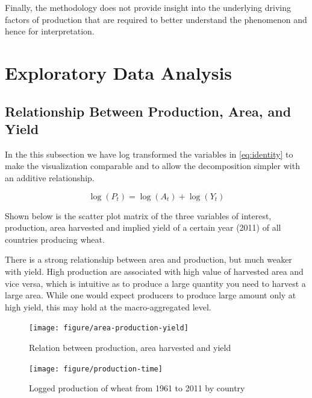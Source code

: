 \documentclass[nojss]{jss}\usepackage[]{graphicx}\usepackage[]{color}
\newenvironment{knitrout}{}{} %
\begin{document}
Finally, the methodology does not provide insight into the underlying
driving factors of production that are required to better understand
the phenomenon and hence for interpretation.


\section{Exploratory Data Analysis}




\subsection{Relationship Between Production, Area, and Yield}

In the this subsection we have log transformed the variables in
\ref{eq:identity} to make the visualization comparable and to allow
the decomposition simpler with an additive relationship.

\begin{equation}
  \label{eq:logIdentity}
  \log(P_t) = \log(A_t) + \log(Y_t)
\end{equation}

Shown below is the scatter plot matrix of the three variables of
interest, production, area harvested and implied yield of a certain
year (2011) of all countries producing wheat. 

There is a strong relationship between area and production, but much
weaker with yield. High production are associated with high value of
harvested area and vice versa, which is intuitive as to produce a
large quantity you need to harvest a large area. While one would
expect producers to produce large amount only at high yield, this may
hold at the macro-aggregated level.

\begin{knitrout}
\color{fgcolor}\begin{figure}[!ht]


{\centering \texttt{[image: figure/area-production-yield]} 

}

\caption[Relation between production, area harvested and yield]{Relation between production, area harvested and yield\label{fig:area-production-yield}}
\end{figure}


\end{knitrout}


\begin{knitrout}
\color{fgcolor}\begin{figure}[!ht]


{\centering \texttt{[image: figure/production-time]} 

}

\caption[Logged production of wheat from 1961 to 2011 by country]{Logged production of wheat from 1961 to 2011 by country\label{fig:production-time}}
\end{figure}


\end{knitrout}
\end{document}
